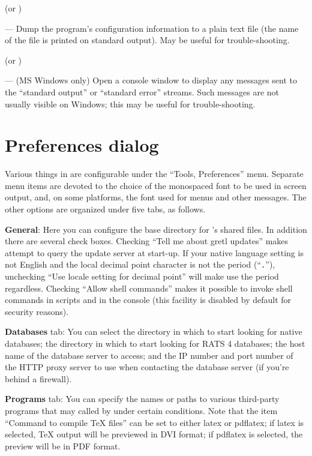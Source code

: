  (or )
      
--- Dump the program's configuration information to a plain text file
(the name of the file is printed on standard output).  May be useful
for trouble-shooting.
      
 (or )

--- (MS Windows only) Open a console window to display any messages
sent to the ``standard output'' or ``standard error'' streams.  Such
messages are not usually visible on Windows; this may be useful for
trouble-shooting.
      
\section{Preferences dialog}
\label{guiprefs}

Various things in  are configurable under the ``Tools,
Preferences'' menu.  Separate menu items are devoted to the choice of
the monospaced font to be used in  screen output, and, on
some platforms, the font used for menus and other messages.  The other
options are organized under five tabs, as follows.
      
\textbf{General}: Here you can configure the base directory for
's shared files. In addition there are several check
boxes. Checking ``Tell me about gretl updates'' makes 
attempt to query the update server at start-up. If your native
language setting is not English and the local decimal point character
is not the period (``\texttt{.}''), unchecking ``Use locale setting
for decimal point'' will make  use the period regardless.
Checking ``Allow shell commands'' makes it possible to invoke shell
commands in scripts and in the  console (this facility is
disabled by default for security reasons).
      
\textbf{Databases} tab: You can select the directory in which to start
looking for native  databases; the directory in which to
start looking for RATS 4 databases; the host name of the 
database server to access; and the IP number and port number of the
HTTP proxy server to use when contacting the database server (if
you're behind a firewall).
      
\textbf{Programs} tab: You can specify the names or paths to various
third-party programs that may called by  under certain
conditions. Note that the item ``Command to compile {\TeX} files'' can
be set to either latex or pdflatex; if latex is selected, {\TeX}
output will be previewed in DVI format; if pdflatex is selected, the
preview will be in PDF format.
      
